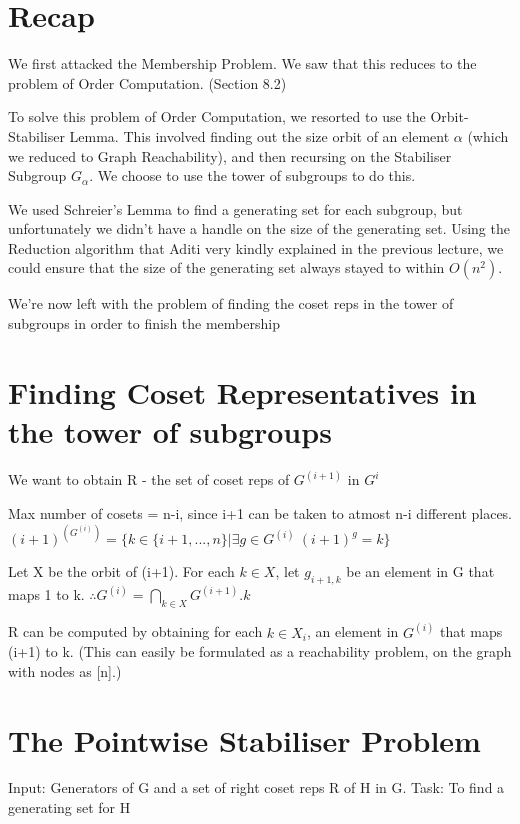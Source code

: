 
\section{Recap}
We first attacked the Membership Problem. We saw that this reduces to the problem of Order Computation. (Section 8.2) 

To solve this problem of Order Computation, we resorted to use the Orbit-Stabiliser Lemma. This involved finding out the size orbit of an element $\alpha$ (which we reduced to Graph Reachability), and then recursing on the Stabiliser Subgroup $G_\alpha$. We choose to use the tower of subgroups to do this.

We used Schreier's Lemma to find a generating set for each subgroup, but unfortunately we didn't have a handle on the size of the generating set. Using the Reduction algorithm that Aditi very kindly explained in the previous lecture, we could ensure that the size of the generating set always stayed to within $O(n^2)$.

We're now left with the problem of finding the coset reps in the tower of subgroups in order to finish the membership 

\section{Finding Coset Representatives in the tower of subgroups}
We want to obtain R - the set of coset reps of $G^{(i+1)}$  in $G^i$

Max number of cosets = n-i, since i+1 can be taken to atmost n-i different places.\newline
$(i+1)^{(G^{(i)})}=\{ k \in \{i+1, . . ., n\} | \exists g \in G^{(i)} \: (i+1)^g = k\} $

Let X be the orbit of (i+1). For each $k \in X$, let $g_{i+1, k}$ be an element in G that maps 1 to k.\newline
$\therefore G^{(i)} = \bigcap_{k \in X} G^{(i+1)} .k$

R can be computed by obtaining for each $k \in X_i$, an element in $G^{(i)}$  that maps (i+1) to k. (This can easily be formulated as a reachability problem, on the graph with nodes as [n].)

\section{The Pointwise Stabiliser Problem}
Input: Generators of G and a set of right coset reps R of H in G.\newline
Task: To find a generating set for H\newline




